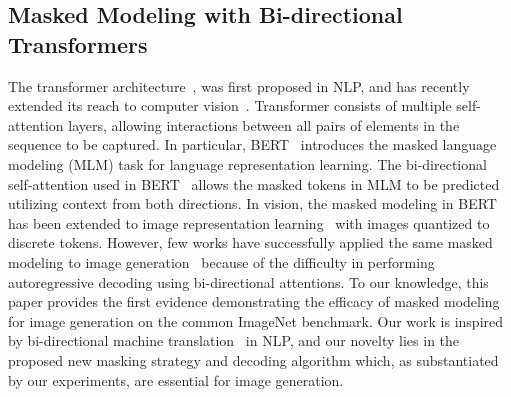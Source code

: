 \subsection{Masked Modeling with Bi-directional Transformers}
The transformer architecture~\cite{Vaswani17attention}, was first proposed in NLP, and has recently extended its reach to computer vision~\cite{dosovitskiy2021vit, caron2021dino}.
Transformer consists of multiple self-attention layers, allowing interactions between all pairs of elements in the sequence to be captured.
In particular, BERT~\cite{Devlin19bert} introduces the masked language modeling (MLM) task for language representation learning. The bi-directional self-attention used in BERT~\cite{Devlin19bert} allows the masked tokens in MLM to be predicted utilizing context from both directions.
In vision, the masked modeling in BERT~\cite{Devlin19bert} has been extended to image representation learning~\cite{he2021mae, Bao2022Beit} with images quantized to discrete tokens. However, few works have successfully applied the same masked modeling to image generation~\cite{zhang2021ufcbert} because of the difficulty in performing autoregressive decoding using bi-directional attentions.
To our knowledge, this paper provides the first evidence demonstrating the efficacy of masked modeling for image generation on the common ImageNet benchmark.
Our work is inspired by bi-directional machine translation~\cite{ghazvininejad2019maskpredict, gu2020fully, gu2017non} in NLP, and our novelty lies in the proposed new masking strategy and decoding algorithm which, as substantiated by our experiments, are essential for image generation.
